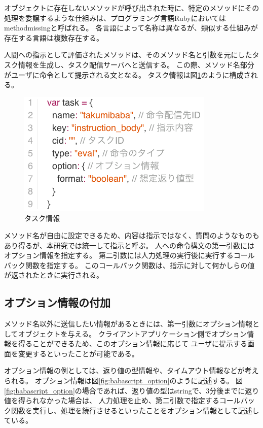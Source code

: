 オブジェクトに存在しないメソッドが呼び出された時に、特定のメソッドにその処理を委譲するような仕組みは、プログラミング言語Rubyにおいては
methodmissingと呼ばれる。
各言語によって名称は異なるが、類似する仕組みが存在する言語は複数存在する。

人間への指示として評価されたメソッドは、そのメソッド名と引数を元にしたタスク情報を生成し、タスク配信サーバへと送信する。
この際、メソッド名部分がユーザに命令として提示される文となる。
タスク情報は図\ref{fig:task_format}のように構成される。

\begin{figure}[htbp]
  \begin{center}
  \includegraphics[width=.6\linewidth,bb=0 0 354 225]{images/task_format.js.png}
  \end{center}
  \caption{タスク情報}
  \label{fig:task_format}
\end{figure}

メソッド名が自由に設定できるため、内容は指示ではなく、質問のようなものもあり得るが、本研究では統一して指示と呼ぶ。
人への命令構文の第一引数にはオプション情報を指定する。
第二引数には人力処理の実行後に実行するコールバック関数を指定する。
このコールバック関数は、指示に対して何かしらの値が返されたときに実行される。

\subsection{オプション情報の付加}\label{ux30aaux30d7ux30b7ux30e7ux30f3ux60c5ux5831ux306eux4ed8ux52a0}

メソッド名以外に送信したい情報があるときには、第一引数にオプション情報としてオブジェクトを与える。
クライアントアプリケーション側でオプション情報を得ることができるため、このオプション情報に応じて
ユーザに提示する画面を変更するといったことが可能である。

オプション情報の例としては、返り値の型情報や、タイムアウト情報などが考えられる。
オプション情報は図\ref{fig:babascript_option}のように記述する。
図\ref{fig:babascript_option}の場合であれば、返り値の型はstringで、3分後までに返り値を得られなかった場合は、
人力処理を止め、第二引数で指定するコールバック関数を実行し、処理を続行させるといったことをオプション情報として記述している。

